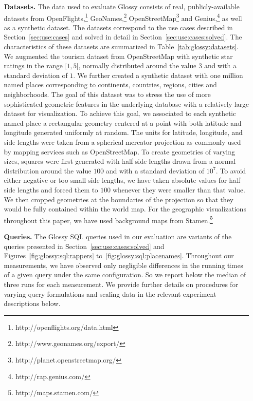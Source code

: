 \documentclass[11pt, oneside]{report}
\newcommand{\minisec}[1]{\noindent\textbf{#1.}}
\begin{document}
\minisec{Datasets}
The data used to evaluate Glossy consists of real, publicly-available datasets from OpenFlights,\footnote{http://openflights.org/data.html} GeoNames,\footnote{http://www.geonames.org/export/} OpenStreetMap\footnote{http://planet.openstreetmap.org/} and Genius,\footnote{http://rap.genius.com/} as well as a synthetic dataset. The datasets correspond to the use cases described in Section~\ref{sec:use:cases} and solved in detail in Section~\ref{sec:use:cases:solved}. The characteristics of these datasets are summarized in Table~\ref{tab:glossy:datasets}. We augmented the tourism dataset from OpenStreetMap with synthetic star ratings in the range $\lbrack 1, 5 \rbrack$, normally distributed around the value $3$ and with a standard deviation of $1$.  We further created a synthetic dataset with one million named places corresponding to continents, countries, regions, cities and neighborhoods. The goal of this dataset was to stress the use of more sophisticated geometric features in the underlying database with a relatively large dataset for visualization. To achieve this goal, we associated to each synthetic named place a rectangular geometry centered at a point with both latitude and longitude generated uniformly at random. The units for latitude, longitude, and side lengths were taken from a spherical mercator projection as commonly used by mapping services such as OpenStreetMap. To create geometries of varying sizes, squares were first generated with half-side lengths drawn from a normal distribution around the value $100$ and with a standard deviation of $10^7$. To avoid either negative or too small side lengths, we have taken absolute values for half-side lengths and forced them to $100$ whenever they were smaller than that value. We then cropped geometries at the boundaries of the projection so that they would be fully contained within the world map. For the geographic visualizations throughout this paper, we have used background maps from Stamen.\footnote{http://maps.stamen.com/}

\minisec{Queries}
The Glossy SQL queries used in our evaluation are variants of the queries presented in Section~\ref{sec:use:cases:solved} and Figures~\ref{fig:glossy:sql:rappers} to~\ref{fig:glossy:sql:placenames}. Throughout our measurements, we have observed only negligible differences in the running times of a given query under the same configuration. So we report below the median of three runs for each measurement. We provide further details on procedures for varying query formulations and scaling data in the relevant experiment descriptions below.  
\end{document}
